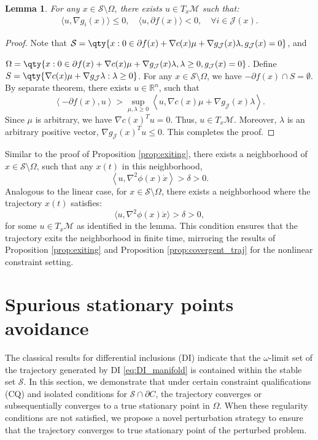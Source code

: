 \documentclass[11pt]{article}
\newcommand{\R}{\mathbb R}
\newcommand{\cJ}{\mathcal J}
\newcommand{\cM}{\mathcal M}
\newcommand{\cS}{\mathcal S}
\def\inner#1{\left\langle#1\right\rangle}
\newtheorem{lemma}{Lemma}[section]
\begin{document}
\begin{lemma}
For any \( x \in \cS \setminus \Omega \), there exists \( u \in T_x \cM \) such that:
\[
\begin{array}{c}
\langle u, \nabla g_i(x) \rangle \leq 0, \quad \langle u, \partial f(x) \rangle < 0,\quad \forall i \in \cJ(x).
\end{array}
\]
\end{lemma}

\begin{proof}
Note that $\cS=\qty{x:0\in\partial f(x)+\nabla c(x)\mu+\nabla g_{\cJ}(x)\lambda, g_\cJ(x)=0}$, and

$\Omega=\qty{x:0\in\partial f(x)+\nabla c(x)\mu+\nabla g_{\cJ}(x)\lambda, \lambda\geq0, g_\cJ(x)=0}$. Define $S=\qty{\nabla c(x)\mu+\nabla g_{\cJ}\lambda:\lambda\geq0}$. For any $x\in\cS\setminus\Omega$, we have $-\partial f(x)\cap S=\emptyset$. By separate theorem, there exists $u\in\R^{n}$, such that
\[
\inner{-\partial f(x),u}>\sup_{\mu,\lambda\geq0}\inner{u,\nabla c(x)\mu+\nabla g_{\cJ}(x)\lambda}.
\]
Since $\mu$ is arbitrary, we have $\nabla c(x)^Tu=0$. Thus, $u\in T_x\cM$. Moreover, $\lambda$ is an arbitrary positive vector, $\nabla g_\cJ(x)^Tu\leq0$. This completes the proof.
\end{proof}
Similar to the proof of Proposition \ref{prop:exiting}, there exists a neighborhood of $x\in\cS\setminus\Omega$, such that any $x(t)$ in this neighborhood,
\[
\inner{u,\nabla^2\phi(x)\dot{x}}>\delta>0.
\]
Analogous to the linear case, for $x \in \mathcal{S} \setminus \Omega$, there exists a neighborhood where the trajectory $x(t)$ satisfies:
$$\langle u, \nabla^2 \phi(x) \dot{x} \rangle > \delta > 0,$$
for some $u \in T_x \mathcal{M}$ as identified in the lemma. This condition ensures that the trajectory exits the neighborhood in finite time, mirroring the results of Proposition \ref{prop:exiting} and Proposition \ref{prop:covergent_traj} for the nonlinear constraint setting.


\section{Spurious stationary points avoidance}
The classical results for differential inclusions (DI) indicate that the $\omega$-limit set of the trajectory generated by DI \eqref{eq:DI_manifold} is contained within the stable set $\mathcal{S}$. In this section, we demonstrate that under certain constraint qualifications (CQ) and isolated conditions for $\mathcal{S} \cap \partial C$, the trajectory converges or subsequentially converges to a true stationary point in $\Omega$. When these regularity conditions are not satisfied, we propose a novel perturbation strategy to ensure that the trajectory converges to true stationary point of the perturbed problem.
\end{document}
